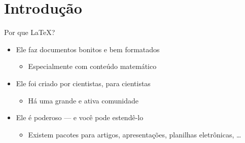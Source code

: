 \documentclass{beamer}
\subtitle{Parte 1: Conceitos Básicos}
\begin{document}
\begin{frame}
	\titlepage
\end{frame}




\section{Introdução}
\begin{frame}{Por que \LaTeX{}?}
	\begin{itemize}
		\item Ele faz documentos bonitos e bem formatados
			\begin{itemize}
				\item Especialmente com conteúdo matemático
			\end{itemize}
%
		\item Ele foi criado por cientistas, para cientistas
			\begin{itemize}
				\item Há uma grande e ativa comunidade
			\end{itemize}
%
		\item Ele é poderoso --- e você pode estendê-lo
			\begin{itemize}
				\item Existem pacotes para artigos, apresentações, planilhas eletrônicas,  \ldots
			\end{itemize}
	\end{itemize}
\end{frame}
\end{document}
